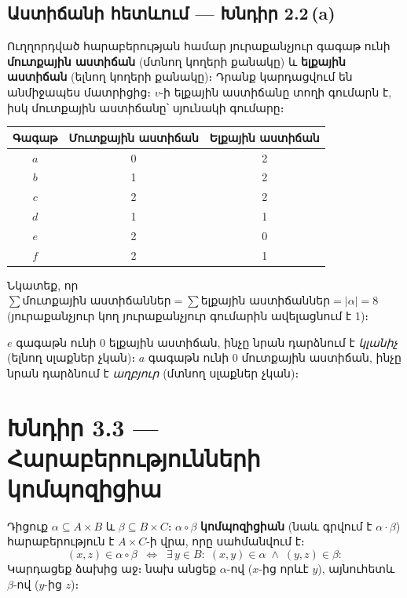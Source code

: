 \documentclass[12pt, a4paper]{article}
\begin{document}
\subsection*{Աստիճանի հետևում — Խնդիր 2.2\,(a)}

Ուղղորդված հարաբերության համար յուրաքանչյուր գագաթ ունի \textbf{մուտքային աստիճան} (մտնող կողերի քանակը) և \textbf{ելքային աստիճան} (ելնող կողերի քանակը)։ Դրանք կարդացվում են անմիջապես մատրիցից։ $v$-ի ելքային աստիճանը տողի գումարն է, իսկ մուտքային աստիճանը՝ սյունակի գումարը։

\begin{center}
\renewcommand{\arraystretch}{1.2}
\begin{tabular}{c|c|c}
  \toprule
  \textbf{Գագաթ} & \textbf{Մուտքային աստիճան} & \textbf{Ելքային աստիճան} \\
  \midrule
  $a$ & 0 & 2 \\
  $b$ & 1 & 2 \\
  $c$ & 2 & 2 \\
  $d$ & 1 & 1 \\
  $e$ & 2 & 0 \\
  $f$ & 2 & 1 \\
  \bottomrule
\end{tabular}
\end{center}

Նկատեք, որ $\sum \text{մուտքային աստիճաններ} = \sum \text{ելքային աստիճաններ} = |\alpha| = 8$ (յուրաքանչյուր կող յուրաքանչյուր գումարին ավելացնում է 1)։

$e$ գագաթն ունի 0 ելքային աստիճան, ինչը նրան դարձնում է \emph{կլանիչ} (ելնող սլաքներ չկան)։
$a$ գագաթն ունի 0 մուտքային աստիճան, ինչը նրան դարձնում է \emph{աղբյուր} (մտնող սլաքներ չկան)։

\newpage
\section{Խնդիր 3.3 — Հարաբերությունների կոմպոզիցիա}

\begin{theorybox}
Դիցուք $\alpha \subseteq A \times B$ և $\beta \subseteq B \times C$։ $\alpha \circ \beta$ \textbf{կոմպոզիցիան} (նաև գրվում է $\alpha \cdot \beta$) հարաբերություն է $A \times C$-ի վրա, որը սահմանվում է։
\[
  (x, z) \in \alpha \circ \beta
  \;\;\Longleftrightarrow\;\;
  \exists\, y \in B:\;
  (x, y) \in \alpha \;\land\; (y, z) \in \beta:
\]
Կարդացեք ձախից աջ։ նախ անցեք $\alpha$-ով ($x$-ից որևէ $y$), այնուհետև $\beta$-ով ($y$-ից $z$)։
\end{theorybox}
\end{document}
